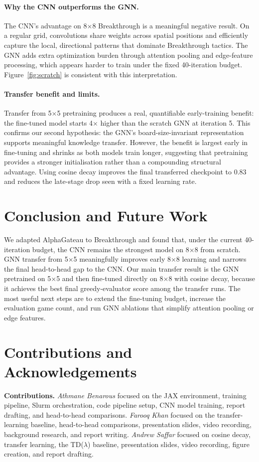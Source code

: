 \documentclass{article}
\begin{document}
\paragraph{Why the CNN outperforms the GNN.}
The CNN's advantage on 8$\times$8 Breakthrough is a meaningful negative result. On a regular grid,
convolutions share weights across spatial positions and efficiently capture the local, directional
patterns that dominate Breakthrough tactics. The GNN adds extra optimization burden through
attention pooling and edge-feature processing, which appears harder to train under the fixed
40-iteration budget. Figure~\ref{fig:scratch} is consistent with this interpretation.

\paragraph{Transfer benefit and limits.}
Transfer from 5$\times$5 pretraining produces a real, quantifiable early-training benefit:
the fine-tuned model starts 4$\times$ higher than the scratch GNN at iteration 5.
This confirms our second hypothesis: the GNN's board-size-invariant representation supports
meaningful knowledge transfer.
However, the benefit is largest early in fine-tuning and shrinks as both models train longer,
suggesting that pretraining provides a stronger initialisation rather than a compounding structural
advantage. Using cosine decay improves the final transferred checkpoint to 0.83 and reduces the
late-stage drop seen with a fixed learning rate.

\section{Conclusion and Future Work}

We adapted AlphaGateau to Breakthrough and found that, under the current 40-iteration budget, the
CNN remains the strongest model on 8$\times$8 from scratch. GNN transfer from
5$\times$5 meaningfully improves early 8$\times$8 learning and narrows the final head-to-head gap
to the CNN. Our main transfer result is the GNN pretrained on 5$\times$5 and then fine-tuned
directly on 8$\times$8 with cosine decay, because it achieves the best final greedy-evaluator
score among the transfer runs. The most useful next steps are to extend the fine-tuning budget,
increase the evaluation game count, and run GNN ablations that simplify attention pooling or edge
features.


\section{Contributions and Acknowledgements}
\textbf{Contributions.}
\textit{Athmane Benarous} focused on the JAX environment, training pipeline, Slurm orchestration, code
pipeline setup, CNN model training, report drafting, and head-to-head comparisons.
\textit{Farooq Khan} focused on the transfer-learning baseline, head-to-head comparisons, presentation
slides, video recording, background research, and report writing.
\textit{Andrew Saffar} focused on cosine decay, transfer learning, the TD($\lambda$) baseline, presentation slides,
video recording, figure creation, and report drafting.
\end{document}
